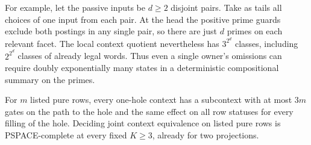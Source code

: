 For example, let the passive inputs be $d\ge2$ disjoint pairs.
Take as tails all choices of one input from each pair. At the
head the positive prime guards exclude both postings in any
single pair, so there are just $d$ primes on each relevant facet.
The local context quotient nevertheless has $3^{2^d}$ classes,
including $2^{2^d}$ classes of already legal words. Thus even a
single owner's omissions can require doubly exponentially many
states in a deterministic compositional summary on the primes.

\begin{proposition}
\label{core:prop:pruning-context-length}
For $m$ listed pure rows, every one-hole context has a subcontext
with at most $3m$ gates on the path to the hole and the same effect
on all row statuses for every filling of the hole. Deciding joint
context equivalence on listed pure rows is PSPACE-complete at
every fixed $K\ge3$, already for two projections.
\end{proposition}

